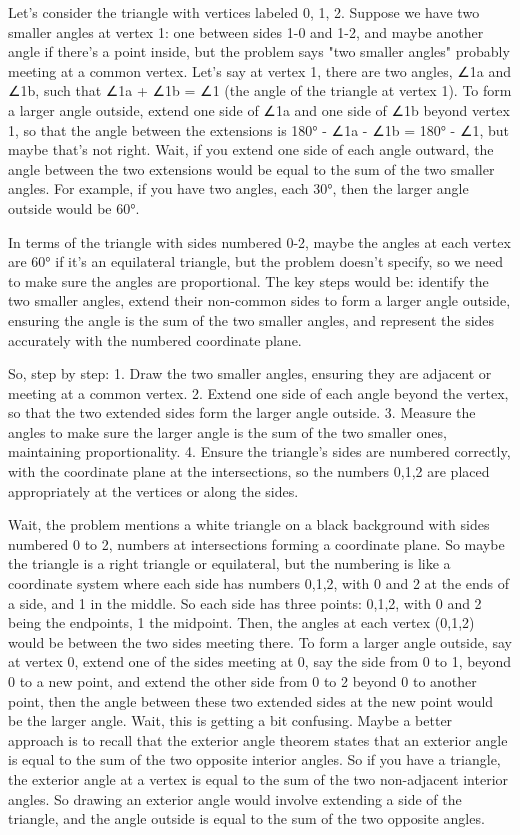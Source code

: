 Let's consider the triangle with vertices labeled 0, 1, 2. Suppose we have two smaller angles at vertex 1: one between sides 1-0 and 1-2, and maybe another angle if there's a point inside, but the problem says "two smaller angles" probably meeting at a common vertex. Let's say at vertex 1, there are two angles, ∠1a and ∠1b, such that ∠1a + ∠1b = ∠1 (the angle of the triangle at vertex 1). To form a larger angle outside, extend one side of ∠1a and one side of ∠1b beyond vertex 1, so that the angle between the extensions is 180° - ∠1a - ∠1b = 180° - ∠1, but maybe that's not right. Wait, if you extend one side of each angle outward, the angle between the two extensions would be equal to the sum of the two smaller angles. For example, if you have two angles, each 30°, then the larger angle outside would be 60°. 

In terms of the triangle with sides numbered 0-2, maybe the angles at each vertex are 60° if it's an equilateral triangle, but the problem doesn't specify, so we need to make sure the angles are proportional. The key steps would be: identify the two smaller angles, extend their non-common sides to form a larger angle outside, ensuring the angle is the sum of the two smaller angles, and represent the sides accurately with the numbered coordinate plane. 

So, step by step: 1. Draw the two smaller angles, ensuring they are adjacent or meeting at a common vertex. 2. Extend one side of each angle beyond the vertex, so that the two extended sides form the larger angle outside. 3. Measure the angles to make sure the larger angle is the sum of the two smaller ones, maintaining proportionality. 4. Ensure the triangle's sides are numbered correctly, with the coordinate plane at the intersections, so the numbers 0,1,2 are placed appropriately at the vertices or along the sides. 

Wait, the problem mentions a white triangle on a black background with sides numbered 0 to 2, numbers at intersections forming a coordinate plane. So maybe the triangle is a right triangle or equilateral, but the numbering is like a coordinate system where each side has numbers 0,1,2, with 0 and 2 at the ends of a side, and 1 in the middle. So each side has three points: 0,1,2, with 0 and 2 being the endpoints, 1 the midpoint. Then, the angles at each vertex (0,1,2) would be between the two sides meeting there. To form a larger angle outside, say at vertex 0, extend one of the sides meeting at 0, say the side from 0 to 1, beyond 0 to a new point, and extend the other side from 0 to 2 beyond 0 to another point, then the angle between these two extended sides at the new point would be the larger angle. Wait, this is getting a bit confusing. Maybe a better approach is to recall that the exterior angle theorem states that an exterior angle is equal to the sum of the two opposite interior angles. So if you have a triangle, the exterior angle at a vertex is equal to the sum of the two non-adjacent interior angles. So drawing an exterior angle would involve extending a side of the triangle, and the angle outside is equal to the sum of the two opposite angles. 

